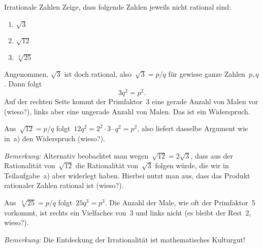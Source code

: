 \documentclass{algblatt}
\begin{document}

\begin{aufgabe}{Irrationale Zahlen}
Zeige, dass folgende Zahlen jeweils nicht rational sind:
\begin{enumerate}
\item $\sqrt{3}$
\item $\sqrt{12}$
\item $\sqrt[3]{25}$
\end{enumerate}
\begin{loesungE}
\item Angenommen, $\sqrt{3}$ ist doch rational, also~$\sqrt{3} = p/q$ für
gewisse ganze Zahlen~$p,q$. Dann folgt
\[ 3 q^2 = p^2. \]
Auf der rechten Seite kommt der Primfaktor~3 eine gerade Anzahl von Malen vor
(wieso?), links aber eine ungerade Anzahl von Malen. Das ist ein Widerspruch.
\item Aus~$\sqrt{12} = p/q$ folgt~$12 q^2 = 2^2 \cdot 3 \cdot q^2 = p^2$, also
liefert dasselbe Argument wie in~a) den Widerspruch (wieso?).

\emph{Bemerkung:} Alternativ beobachtet man wegen~$\sqrt{12} = 2 \sqrt{3}$,
dass aus der Rationalität von~$\sqrt{12}$ die Rationalität von~$\sqrt{3}$
folgen würde, die wir in Teilaufgabe~a) aber widerlegt haben. Hierbei nutzt man
aus, dass das Produkt rationaler Zahlen rational ist (wieso?).

\item Aus~$\sqrt[3]{25} = p/q$ folgt~$25 q^3 = p^3$. Die Anzahl der Male, wie
oft der Primfaktor~5 vorkommt, ist rechts ein Vielfaches von~3 und links nicht
(es bleibt der Rest~2, wieso?).
\end{loesungE}

\emph{Bemerkung:} Die Entdeckung der Irrationalität ist mathematisches
Kulturgut!
\end{aufgabe}
\end{document}
